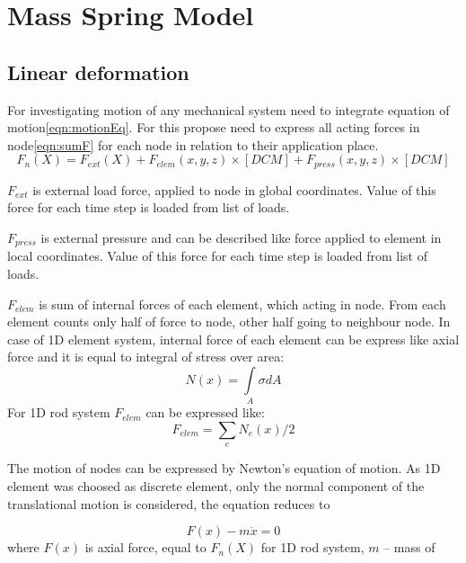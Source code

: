 \section*{Mass Spring Model}
\subsection*{Linear deformation}
For investigating motion of any mechanical system need to integrate equation of
motion\eqref{eqn:motionEq}. For this propose need to express all acting forces in
node\eqref{eqn:sumF} for each node in relation to their application place. 
\begin{equation}\label{eqn:sumF}
   F_n(X)=
   F_{ext}(X)+
   F_{elem}(x, y, z)\times[DCM]+
   F_{press}(x, y, z)\times[DCM]
\end{equation}\par
$F_{ext}$ is external load force, applied to node in global coordinates. Value
of this force for each time step is loaded from list of loads.\par $F_{press}$
is external pressure and can be described like force applied to element in local
coordinates. Value of this force for each time step is loaded from list of
loads.\par $F_{elem}$ is sum of internal forces of each element, which acting in
node. From each element counts only half of force to node, other half going to
neighbour node. In case of 1D element system, internal force of each element can
be express like axial force and it is equal to integral of stress over area:
\begin{equation}\label{eqn:Nx}
  N(x)= \int\limits_A \sigma dA
\end{equation}
For 1D rod system $F_{elem}$ can be expressed like:
\begin{equation}\label{eqn:Felem}
  F_{elem}= \sum_{e}N_e(x)/2
\end{equation}\par
The motion of nodes can be expressed by Newton's equation of motion. As 1D
element was choosed as discrete element, only the normal component of the
translational motion is considered, the equation reduces to\par
\begin{equation}\label{eqn:motionEq}
   F(x)-m\ddot{x}=0
\end{equation}
where $F(x)$ is axial force, equal to $F_n(X)$ for 1D rod system, $m$ – mass of
